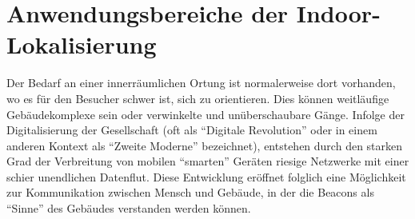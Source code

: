 \section{Anwendungsbereiche der Indoor-Lokalisierung}
Der Bedarf an einer innerräumlichen Ortung ist normalerweise dort vorhanden, wo es für den Besucher schwer ist, sich zu orientieren. Dies können weitläufige Gebäudekomplexe sein oder verwinkelte und unüberschaubare Gänge. Infolge der Digitalisierung der Gesellschaft (oft als "`Digitale Revolution"' oder in einem anderen Kontext als "`Zweite Moderne"' \cite{DigRev} bezeichnet), entstehen durch den starken Grad der Verbreitung von mobilen "`smarten"' Geräten riesige Netzwerke mit einer schier unendlichen Datenflut. Diese Entwicklung eröffnet folglich eine Möglichkeit zur Kommunikation zwischen Mensch und Gebäude, in der die Beacons als "`Sinne"' des Gebäudes verstanden werden können.  
